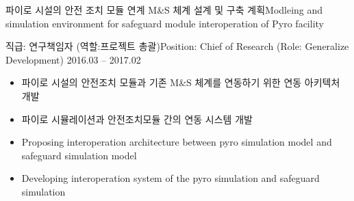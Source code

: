 \documentclass[english,full]{resume_structure}
\begin{document}
\begin{Project}
{파이로 시설의 안전 조치 모듈 연계 M\&S 체계 설계 및 구축 계획}{Modleing and simulation environment for safeguard module interoperation of Pyro facility}
{}{} 
{
\ResumeSubSection %
    {직급: 연구책임자 (역할:프로젝트 총괄)}{Position: Chief of Research (Role: Generalize Development)}
    {2016.03 -- 2017.02}
    {
      \begin{itemize}
        \item 파이로 시설의 안전조치 모듈과 기존 M\&S 체계를 연동하기 위한 연동 아키텍처 개발
        \item 파이로 시뮬레이션과 안전조치모듈 간의 연동 시스템 개발
      \end{itemize}
    }
    {
      \begin{itemize}
        \item Proposing interoperation architecture between pyro simulation model and safeguard simulation model
        \item Developing interoperation system of the pyro simulation and safeguard simulation
      \end{itemize}
    }
}
\end{Project}
\end{document}
